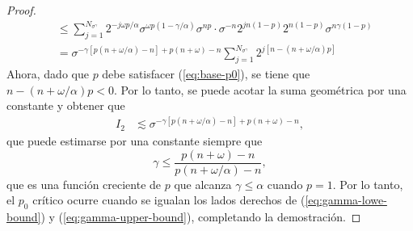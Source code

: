 \begin{proof}
\begin{align*}
		 &\leq \sum_{j=1}^{N_{\sigma^\gamma}} 2^{-j\omega p/\alpha}\sigma^{\omega p(1-\gamma/\alpha)}\sigma^{np} \cdot \sigma^{-n}2^{jn(1-p)}2^{n(1-p)}\sigma^{n\gamma(1-p)}\\
		 & = \sigma^{-\gamma[p(n+\omega/\alpha)-n] +p(n+\omega)-n} \sum_{j=1}^{N_{\sigma^\gamma}} 2^{j[n-(n+\omega/\alpha)p]}
	\end{align*}
	Ahora, dado que $p$ debe satisfacer (\ref{eq:base-p0}), se tiene que $n - (n+\omega/\alpha)p < 0$. Por lo tanto, se puede acotar la suma geométrica por una constante y obtener que
	\begin{align*}
		I_2  & \lesssim \sigma^{-\gamma[p(n+\omega/\alpha)-n] +p(n+\omega)-n},
	\end{align*}
	que puede estimarse por una constante siempre que 
	\begin{equation}
		\gamma \leq \frac{p(n+\omega)-n}{p(n+\omega/\alpha)-n},
		\label{eq:gamma-upper-bound}
	\end{equation}
	que es una función creciente de $p$ que alcanza $\gamma \leq \alpha$ cuando $p=1$. Por lo tanto, el $p_0$ crítico ocurre cuando se igualan los lados derechos de (\ref{eq:gamma-lowe-bound}) y (\ref{eq:gamma-upper-bound}), completando la demostración.
\end{proof} 

